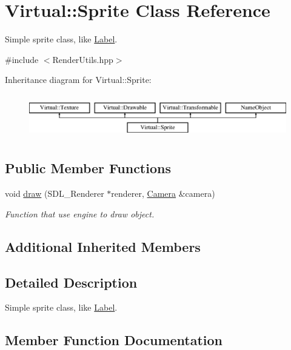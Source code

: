 \hypertarget{class_virtual_1_1_sprite}{}\section{Virtual\+:\+:Sprite Class Reference}
\label{class_virtual_1_1_sprite}


Simple sprite class, like \hyperlink{class_virtual_1_1_label}{Label}.  




{\ttfamily \#include $<$Render\+Utils.\+hpp$>$}

Inheritance diagram for Virtual\+:\+:Sprite\+:\begin{figure}[H]
\begin{center}
\leavevmode
\includegraphics[height=1.944445cm]{class_virtual_1_1_sprite}
\end{center}
\end{figure}
\subsection*{Public Member Functions}
\begin{DoxyCompactItemize}
\item 
void \hyperlink{class_virtual_1_1_sprite_a57f581e0307ab2b2dd7c6922dba2a057}{draw} (S\+D\+L\+\_\+\+Renderer $\ast$renderer, \hyperlink{class_virtual_1_1_camera}{Camera} \&camera)
\begin{DoxyCompactList}\small\item\em Function that use engine to draw object. \end{DoxyCompactList}\end{DoxyCompactItemize}
\subsection*{Additional Inherited Members}


\subsection{Detailed Description}
Simple sprite class, like \hyperlink{class_virtual_1_1_label}{Label}. 

\subsection{Member Function Documentation}
\hypertarget{class_virtual_1_1_sprite_a57f581e0307ab2b2dd7c6922dba2a057}{}\label{class_virtual_1_1_sprite_a57f581e0307ab2b2dd7c6922dba2a057} 
